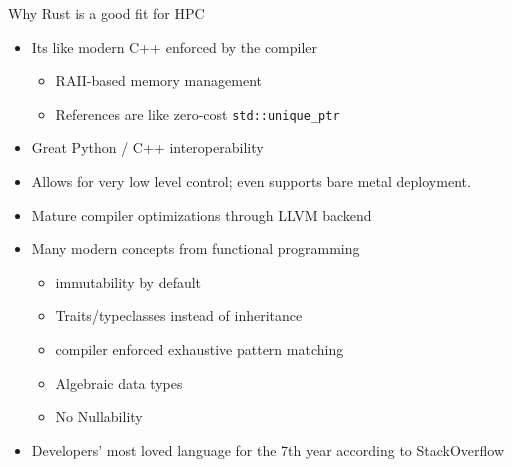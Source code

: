 \documentclass[compress,aspectratio=169]{beamer}
\begin{document}
\begin{frame}{Why Rust is a good fit for HPC}
  \begin{itemize}
      \pause
    \item Its like modern C++ enforced by the compiler
      \begin{itemize}
        \item RAII-based memory management
        \item References are like zero-cost \texttt{std::unique\_ptr}
      \end{itemize}
      \pause
    \item Great Python / C++ interoperability
      \pause
    \item Allows for very low level control; even supports bare metal deployment.
      \pause
    \item Mature compiler optimizations through LLVM backend
      \pause
    \item Many modern concepts from functional programming
      \begin{itemize}
        \item immutability by default
        \item Traits/typeclasses instead of inheritance
        \item compiler enforced exhaustive pattern matching
        \item Algebraic data types
        \item No Nullability
      \end{itemize}
      \pause
      \item Developers' most loved language for the 7th year according to StackOverflow \cite{sosurvey}
  \end{itemize}
\end{frame}
\end{document}

